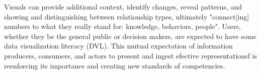 Visuals can provide additional context, identify changes, reveal patterns, and showing and distinguishing between relationship types\cite{Shneiderman1996},  %
ultimately "connect[ing] numbers to what they really stand for: knowledge, behaviors, people"\cite{Lupi2017}. %
Users,  whether they be the general public or decision makers, are expected to have some data visualization literacy (DVL)\cite{Borner2019}. %
This mutual expectation of information producers, consumers, and actors to present and ingest efective representationsf is reenforcing its importance and creating new standards of competencies.  %
